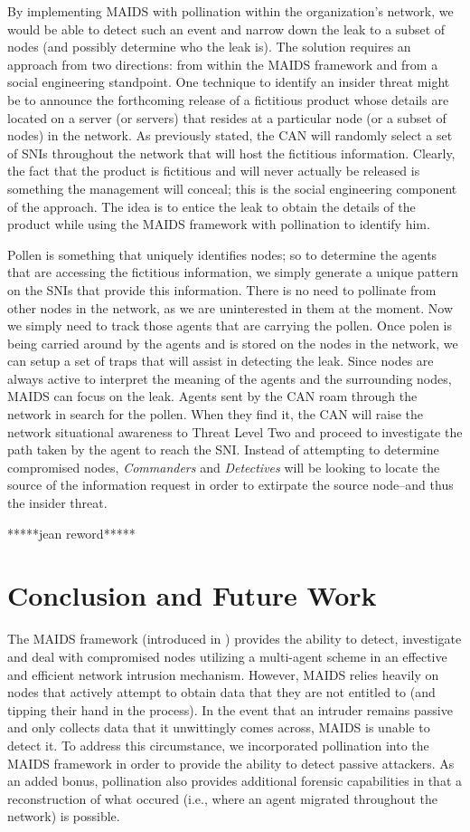 \documentclass{acm_proc_article-sp}
\begin{document}
By implementing MAIDS with pollination within the organization's network, we would be able to detect such an event and narrow down the leak to a subset of nodes (and possibly determine who the leak is).  The solution requires an approach from two directions: from within the MAIDS framework and from a social engineering standpoint.  One technique to identify an insider threat might be to announce the forthcoming release of a fictitious product whose details are located on a server (or servers) that resides at a particular node (or a subset of nodes) in the network.  As previously stated, the CAN will randomly select a set of SNIs throughout the network that will host the fictitious information.  Clearly, the fact that the product is fictitious and will never actually be released is something the management will conceal; this is the social engineering component of the approach.  The idea is to entice the leak to obtain the details of the product while using the MAIDS framework with pollination to identify him.

Pollen is something that uniquely identifies nodes; so to determine the agents that are accessing the fictitious information, we simply generate a unique pattern on the SNIs that provide this information.  There is no need to pollinate from other nodes in the network, as we are uninterested in them at the moment.  Now we simply need to track those agents that are carrying the pollen.  Once polen is being carried around by the agents and is stored on the nodes in the network, we can setup a set of traps that will assist in detecting the leak.  Since nodes are always active to interpret the meaning of the agents and the surrounding nodes, MAIDS can focus on the leak.  Agents sent by the CAN roam through the network in search for the pollen.  When they find it, the CAN will raise the network situational awareness to Threat Level Two and proceed to investigate the path taken by the agent to reach the SNI.  Instead of attempting to determine compromised nodes, {\it Commanders} and {\it Detectives} will be looking to locate the source of the information request in order to extirpate the source node--and thus the insider threat.

*****jean reword*****

\section{Conclusion and Future Work}
The MAIDS framework (introduced in \cite{kackley09}) provides the ability to detect, investigate and deal with compromised nodes utilizing a multi-agent scheme in an effective and efficient network intrusion mechanism.  However, MAIDS relies heavily on nodes that actively attempt to obtain data that they are not entitled to (and tipping their hand in the process).  In the event that an intruder remains passive and only collects data that it unwittingly comes across, MAIDS is unable to detect it.  To address this circumstance, we incorporated pollination into the MAIDS framework in order to provide the ability to detect passive attackers.  As an added bonus, pollination also provides additional forensic capabilities in that a reconstruction of what occured (i.e., where an agent migrated throughout the network) is possible.
\end{document}

